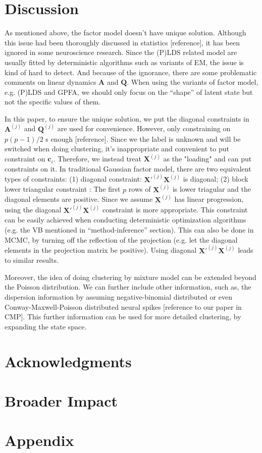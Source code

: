 \documentclass{article}
\begin{document}
	\section{Discussion}
	
	As mentioned above, the factor model doesn’t have unique solution. Although this issue had been thoroughly discussed in statistics [reference], it has been ignored in some neuroscience research. Since the (P)LDS related model are usually fitted by deterministic algorithms such as variants of EM, the issue is kind of hard to detect. And because of the ignorance, there are some problematic comments on linear dynamics $\bm{A}$ and $\bm{Q}$. When using the variants of factor model, e.g. (P)LDS and GPFA, we should only focus on the “shape” of latent state but not the specific values of them.
	
	In this paper, to ensure the unique solution, we put the diagonal constraints in $\bm{A}^{(j)}$ and $\bm{Q}^{(j)}$ are used for convenience. However, only constraining on $p(p-1)/2$ s enough [reference]. Since we the label is unknown and will be switched when doing clustering, it’s inappropriate and convenient to put constraint on $\bm{c}_i$. Therefore, we instead treat $\bm{X}^{(j)}$ as the "loading" and can put constraints on it. In traditional Gaussian factor model, there are two equivalent types of constraints: (1) diagonal constraint: $\bm{X}'^{(j)}\bm{X}^{(j)}$ is diagonal; (2) block lower triangular constraint \citep{Fokoue2003}: The first $p$ rows of $\bm{X}^{(j)}$ is lower triagular and the diagonal elements are positive. Since we assume $\bm{X}^{(j)}$ has linear progression, using the diagonal $\bm{X}'^{(j)}\bm{X}^{(j)}$ constraint is more appropriate. This constraint can be easily achieved when conducting deterministic optimization algorithms (e.g. the VB mentioned in “method-inference” section). This can also be done in MCMC, by turning off the reflection of the projection (e.g. let the diagonal elements in the projection matrix be positive). Using diagonal $\bm{X}'^{(j)}\bm{X}^{(j)}$  leads to similar results.
	
	Moreover, the idea of doing clustering by mixture model can be extended beyond the Poisson distribution. We can further include other information, such as, the dispersion information by assuming negative-binomial distributed or even Conway-Maxwell-Poisson distributed neural spikes [reference to our paper in CMP]. This further information can be used for more detailed clustering, by expanding the state space.
	
	\section*{Acknowledgments}
	
	\section*{Broader Impact}
	
	\newpage
	{
		\small
		
	}
	
	
	\appendix
	
	\section{Appendix}
	
	
	
\end{document}
